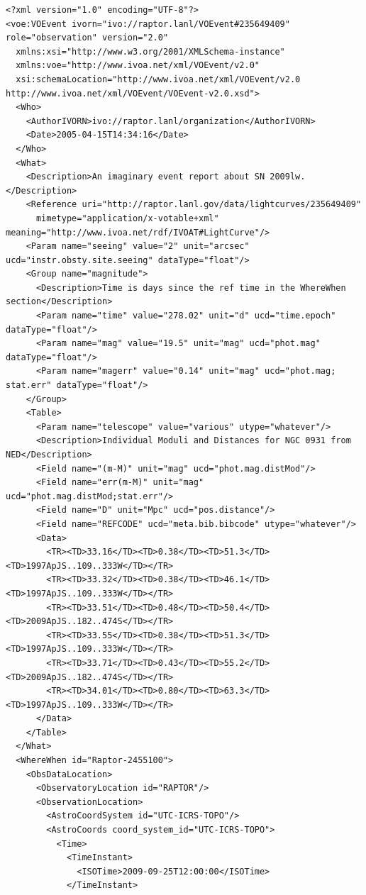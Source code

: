 \documentclass[11pt,a4paper]{ivoa}
\begin{document}
{\footnotesize
\begin{verbatim}
<?xml version="1.0" encoding="UTF-8"?>
<voe:VOEvent ivorn="ivo://raptor.lanl/VOEvent#235649409" role="observation" version="2.0"
  xmlns:xsi="http://www.w3.org/2001/XMLSchema-instance"
  xmlns:voe="http://www.ivoa.net/xml/VOEvent/v2.0"
  xsi:schemaLocation="http://www.ivoa.net/xml/VOEvent/v2.0     http://www.ivoa.net/xml/VOEvent/VOEvent-v2.0.xsd">
  <Who>
    <AuthorIVORN>ivo://raptor.lanl/organization</AuthorIVORN>
    <Date>2005-04-15T14:34:16</Date>
  </Who>
  <What>
    <Description>An imaginary event report about SN 2009lw.</Description>
    <Reference uri="http://raptor.lanl.gov/data/lightcurves/235649409"
      mimetype="application/x-votable+xml" meaning="http://www.ivoa.net/rdf/IVOAT#LightCurve"/>
    <Param name="seeing" value="2" unit="arcsec" ucd="instr.obsty.site.seeing" dataType="float"/>
    <Group name="magnitude">
      <Description>Time is days since the ref time in the WhereWhen section</Description>
      <Param name="time" value="278.02" unit="d" ucd="time.epoch" dataType="float"/>
      <Param name="mag" value="19.5" unit="mag" ucd="phot.mag" dataType="float"/>
      <Param name="magerr" value="0.14" unit="mag" ucd="phot.mag; stat.err" dataType="float"/>
    </Group>
    <Table>
      <Param name="telescope" value="various" utype="whatever"/>
      <Description>Individual Moduli and Distances for NGC 0931 from NED</Description>
      <Field name="(m-M)" unit="mag" ucd="phot.mag.distMod"/>
      <Field name="err(m-M)" unit="mag" ucd="phot.mag.distMod;stat.err"/>
      <Field name="D" unit="Mpc" ucd="pos.distance"/>
      <Field name="REFCODE" ucd="meta.bib.bibcode" utype="whatever"/>
      <Data>
        <TR><TD>33.16</TD><TD>0.38</TD><TD>51.3</TD><TD>1997ApJS..109..333W</TD></TR>
        <TR><TD>33.32</TD><TD>0.38</TD><TD>46.1</TD><TD>1997ApJS..109..333W</TD></TR>
        <TR><TD>33.51</TD><TD>0.48</TD><TD>50.4</TD><TD>2009ApJS..182..474S</TD></TR>
        <TR><TD>33.55</TD><TD>0.38</TD><TD>51.3</TD><TD>1997ApJS..109..333W</TD></TR>
        <TR><TD>33.71</TD><TD>0.43</TD><TD>55.2</TD><TD>2009ApJS..182..474S</TD></TR>
        <TR><TD>34.01</TD><TD>0.80</TD><TD>63.3</TD><TD>1997ApJS..109..333W</TD></TR>
      </Data>
    </Table>
  </What>
  <WhereWhen id="Raptor-2455100">
    <ObsDataLocation>
      <ObservatoryLocation id="RAPTOR"/>
      <ObservationLocation>
        <AstroCoordSystem id="UTC-ICRS-TOPO"/>
        <AstroCoords coord_system_id="UTC-ICRS-TOPO">
          <Time>
            <TimeInstant>
              <ISOTime>2009-09-25T12:00:00</ISOTime>
            </TimeInstant>

\end{verbatim}}
\end{document}
